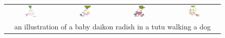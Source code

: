 \begin{figure}[ht!]
\begin{tabular}{cccc}
        \includegraphics[width=0.24\textwidth]{figures/cross/radish_0.jpg} &
        \includegraphics[width=0.24\textwidth]{figures/cross/radish_1.jpg} &
        \includegraphics[width=0.24\textwidth]{figures/cross/radish_2.jpg} &
        \includegraphics[width=0.24\textwidth]{figures/cross/radish_3.jpg} \vspace{-1mm}\\
        \multicolumn{4}{c}{\small an illustration of a baby daikon radish in a tutu walking a dog}\\


\end{tabular}
\end{figure}
